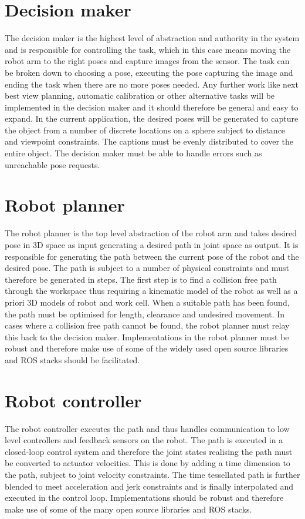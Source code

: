 \section{Decision maker}
The decision maker is the highest level of abstraction and authority in the system and is responsible for controlling the task, which in this case means moving the robot arm to the right poses and capture images from the sensor. The task can be broken down to choosing a pose, executing the pose capturing the image and ending the task when there are no more poses needed. Any further work like next best view planning, automatic calibration or other alternative tasks will be implemented in the decision maker and it should therefore be general and easy to expand. In the current application, the desired poses will be generated to capture the object from a number of discrete locations on a sphere subject to distance and viewpoint constraints. The captions must be evenly distributed to cover the entire object. The decision maker must be able to handle errors such as unreachable pose requests.

\section{Robot planner}
The robot planner is the top level abstraction of the robot arm and takes desired pose in 3D space as input generating a desired path in joint space as output. It is responsible for generating the path between the current pose of the robot and the desired pose. The path is subject to a number of physical constraints and must therefore be generated in steps. The first step is to find a collision free path through the workspace thus requiring a kinematic model of the robot as well as a priori 3D models of robot and work cell. When a suitable path has been found, the path must be optimised for length, clearance and undesired movement. In cases where a collision free path cannot be found, the robot planner must relay this back to the decision maker. Implementations in the robot planner must be robust and therefore make use of some of the widely used open source libraries and ROS stacks should be facilitated. 

\section{Robot controller}
The robot controller executes the path and thus handles communication to low level controllers and feedback sensors on the robot. The path is executed in a closed-loop control system and therefore the joint states realising the path must be converted to actuator velocities. This is done by adding a time dimension to the path, subject to joint velocity constraints. The time tessellated path is further blended to meet acceleration and jerk constraints and is finally interpolated and executed in the control loop. Implementations should be robust and therefore make use of some of the many open source libraries and ROS stacks. 

